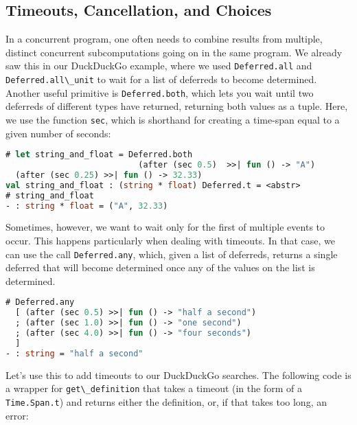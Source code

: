\hypertarget{timeouts-cancellation-and-choices}{%
\subsection{Timeouts, Cancellation, and
Choices}\label{timeouts-cancellation-and-choices}}

In a concurrent program, one often needs to combine results from
multiple, distinct concurrent subcomputations going on in the same
program. We already saw this in our DuckDuckGo example, where we used
\passthrough{\lstinline!Deferred.all!} and
\passthrough{\lstinline!Deferred.all\_unit!} to wait for a list of
deferreds to become determined. Another useful primitive is
\passthrough{\lstinline!Deferred.both!}, which lets you wait until two
deferreds of different types have returned, returning both values as a
tuple. Here, we use the function \passthrough{\lstinline!sec!}, which is
shorthand for creating a time-span equal to a given number of seconds:

\begin{lstlisting}[language=Caml]
# let string_and_float = Deferred.both
                           (after (sec 0.5)  >>| fun () -> "A")
  (after (sec 0.25) >>| fun () -> 32.33)
val string_and_float : (string * float) Deferred.t = <abstr>
# string_and_float
- : string * float = ("A", 32.33)
\end{lstlisting}

Sometimes, however, we want to wait only for the first of multiple
events to occur. This happens particularly when dealing with timeouts.
In that case, we can use the call
\passthrough{\lstinline!Deferred.any!}, which, given a list of
deferreds, returns a single deferred that will become determined once
any of the values on the list is determined.

\begin{lstlisting}[language=Caml]
# Deferred.any
  [ (after (sec 0.5) >>| fun () -> "half a second")
  ; (after (sec 1.0) >>| fun () -> "one second")
  ; (after (sec 4.0) >>| fun () -> "four seconds")
  ]
- : string = "half a second"
\end{lstlisting}

Let's use this to add timeouts to our DuckDuckGo searches. The following
code is a wrapper for \passthrough{\lstinline!get\_definition!} that
takes a timeout (in the form of a \passthrough{\lstinline!Time.Span.t!})
and returns either the definition, or, if that takes too long, an error:

